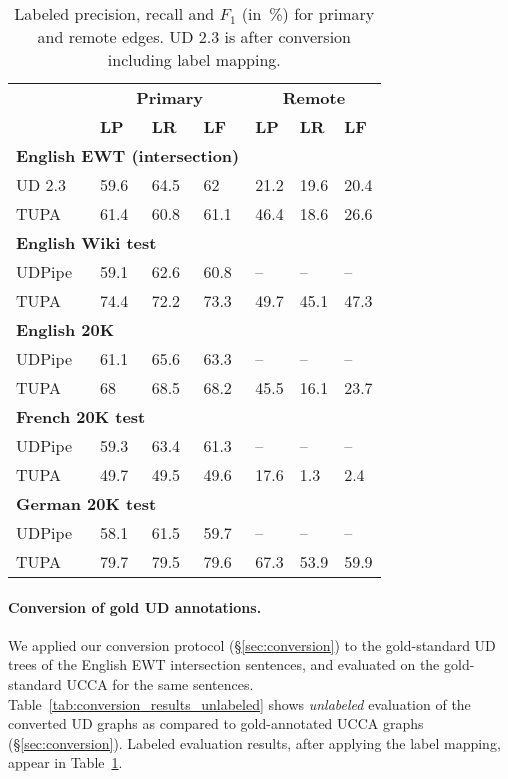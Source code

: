 \documentclass[11pt,a4paper]{article}
\begin{document}
\begin{table}[t]
\centering
\begin{tabular}{l|lll|lll}
& \multicolumn{3}{c|}{\footnotesize \bf Primary} & \multicolumn{3}{c}{\footnotesize \bf Remote} \\
& \footnotesize \textbf{LP} & \footnotesize \textbf{LR} & \footnotesize \textbf{LF}
& \footnotesize \textbf{LP} & \footnotesize \textbf{LR} & \footnotesize \textbf{LF} \\
\hline
\multicolumn{4}{l|}{\small \bf English EWT (intersection)} & \\
\footnotesize UD 2.3
& 59.6 & 64.5 & 62 & 21.2 & 19.6 & 20.4 \\
\footnotesize TUPA
& 61.4 & 60.8 & 61.1 & 46.4 & 18.6 & 26.6 \\
\multicolumn{4}{l|}{\small \bf English Wiki test} & \\
\footnotesize UDPipe
& 59.1 & 62.6 & 60.8 & -- & -- & -- \\
\footnotesize TUPA
& 74.4 & 72.2 & 73.3 & 49.7 & 45.1 & 47.3 \\
\multicolumn{4}{l|}{\small \bf English 20K} & \\
\footnotesize UDPipe
& 61.1 & 65.6 & 63.3 & -- & -- & -- \\
\footnotesize TUPA
& 68 & 68.5 & 68.2 & 45.5 & 16.1 & 23.7 \\
\multicolumn{4}{l|}{\small \bf French 20K test} & \\
\footnotesize UDPipe
& 59.3 & 63.4 & 61.3 & -- & -- & -- \\
\footnotesize TUPA
& 49.7 & 49.5 & 49.6 & 17.6 & 1.3 & 2.4 \\
\multicolumn{4}{l|}{\small \bf German 20K test} & \\
\footnotesize UDPipe
& 58.1 & 61.5 & 59.7 & -- & -- & -- \\
\footnotesize TUPA
& 79.7 & 79.5 & 79.6 & 67.3 & 53.9 & 59.9
\end{tabular}
\caption{
Labeled precision, recall and $F_1$ (in~\%) for primary and remote edges.
UD 2.3 is after conversion including label mapping.
\label{tab:conversion_results_labeled}}
\end{table}


\paragraph{Conversion of gold UD annotations.}

We applied our conversion protocol (\S\ref{sec:conversion}) to
the gold-standard UD trees of the English EWT intersection sentences,
and evaluated on the gold-standard UCCA for the same sentences.
Table~\ref{tab:conversion_results_unlabeled} shows \textit{unlabeled} evaluation of the
converted UD graphs as compared to gold-annotated UCCA graphs (\S\ref{sec:conversion}).
Labeled evaluation results, after applying the label mapping,
appear in Table~\ref{tab:conversion_results_labeled}.
\end{document}
